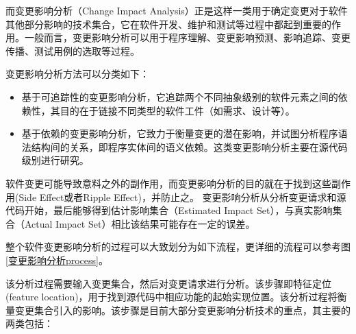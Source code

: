 而变更影响分析（Change Impact Analysis）正是这样一类用于确定变更对于软件其他部分影响的技术集合\cite{li2013survey}，它在软件开发、维护和测试等过程中都起到重要的作用\cite{acharya2011practical}。一般而言，变更影响分析可以用于程序理解、变更影响预测、影响追踪、变更传播、测试用例的选取等过程。

变更影响分析方法可以分类如下：
\begin{itemize}
	\item 基于可追踪性的变更影响分析\cite{de2008traceability}，它追踪两个不同抽象级别的软件元素之间的依赖性，其目的在于链接不同类型的软件工件（如需求、设计等）。

	\item 基于依赖的变更影响分析\cite{law2003incremental}，它致力于衡量变更的潜在影响，并试图分析程序语法结构间的关系，即程序实体间的语义依赖。这类变更影响分析主要在源代码级别进行研究。
\end{itemize}

软件变更可能导致意料之外的副作用，而变更影响分析的目的就在于找到这些副作用(Side Effect或者Ripple Effect)\cite{bohner1996software}，并防止之。
变更影响分析从分析变更请求和源代码开始，最后能够得到估计影响集合（Estimated Impact Set），与真实影响集合（Actual Impact Set）相比该结果可能存在一定的误差。

整个软件变更影响分析的过程可以大致划分为如下流程\cite{de2008traceability,bohner2002software}，更详细的流程可以参考图\ref {变更影响分析process}。

	该分析过程需要输入变更集合，然后对变更请求进行分析。该步骤即特征定位(feature location)，用于找到源代码中相应功能的起始实现位置\cite{biggerstaff1993concept}。该分析过程将衡量变更集合引入的影响。该步骤是目前大部分变更影响分析技术的重点，其主要的两类包括：
	
